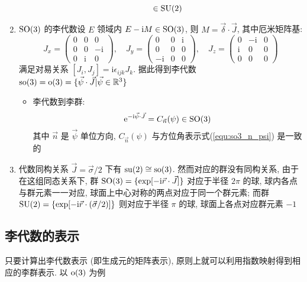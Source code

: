 \documentclass[12pt,a4paper]{article}%
\numberwithin{equation}{section}%
\newcommand\mi{\mathrm{i}}
\newcommand\e{\mathrm{e}}%
\begin{document}
\begin{enumerate}
\begin{itemize}
\begin{equation}
			\in\mathrm{SU}(2)
		\end{equation}
	\end{itemize}
	\item $\mathrm{SO}(3)$ 的李代数设 $E$ 领域内 $E - \mi M \in \Group{SO}(3)$, 则 $M = \vec\delta\cdot\vec J$, 其中厄米矩阵基:
	\begin{equation}
		J_x = \begin{pmatrix}
			0 & 0 & 0 \\
			0 & 0 & -\mi \\
			0 & \mi & 0
		\end{pmatrix},\quad
		J_y = \begin{pmatrix}
			0 & 0 & \mi \\
			0 & 0 & 0 \\
			-\mi & 0 & 0
		\end{pmatrix},\quad
		J_z = \begin{pmatrix}
			0 & -\mi & 0\\
			\mi & 0 & 0 \\
			0 & 0 & 0
		\end{pmatrix}
	\end{equation}
	满足对易关系 $[J_i, J_j] = \mi\epsilon_{ijk}J_k$. 据此得到李代数  $\mathrm{so}(3) = \mathrm{o}(3) = \{\vec \psi\cdot\vec J|\vec \psi\in\mathbb R^3\}$
	\begin{itemize}
		\item 李代数到李群: 
		\begin{equation}
			\e^{-\mi\vec \psi\cdot\vec J} = C_{\vec n}(\psi) \in\Group{SO}(3)
		\end{equation}
		其中 $\vec n$ 是 $\vec \psi$ 单位方向, $C_{\vec n}(\psi)$ 与方位角表示式(\ref{equ:so3_n_psi}) 是一致的
	\end{itemize}
	\item 代数同构关系 $\vec J = \vec \sigma /2$ 下有 $\mathrm{su}(2)\cong\mathrm{so}(3)$. 然而对应的群没有同构关系, 由于在这组同态关系下, 群 $\Group{SO}(3) = \{\exp[-\mi\vec r\cdot\vec J]\}$ 对应于半径 $2\pi$ 的球, 球内各点与群元素一一对应, 球面上中心对称的两点对应于同一个群元素; 而群 $\Group{SU}(2) = \{\exp[-\mi\vec r\cdot(\vec \sigma/2)]\}$ 则对应于半径 $\pi$ 的球, 球面上各点对应群元素 $-1$
\end{enumerate}
\subsection{李代数的表示} %
只要计算出李代数表示 (即生成元的矩阵表示), 原则上就可以利用指数映射得到相应的李群表示. 以 $\mathrm{o}(3)$ 为例
\end{document}
